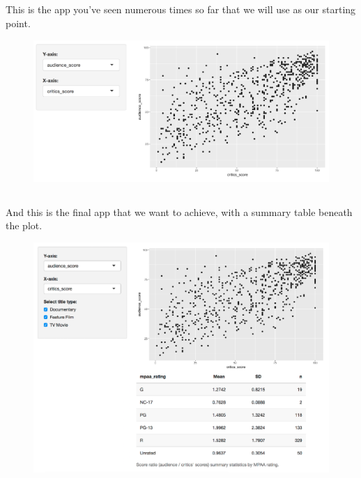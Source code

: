 \documentclass[
  letterpaper,
  DIV=11,
  numbers=noendperiod]{scrreprt}
\begin{document}
\hypertarget{section-38}{%
\subsection{}\label{section-38}}

This is the app you've seen numerous times so far that we will use as
our starting point.

\begin{figure}

{\centering \includegraphics[width=1\textwidth,height=\textheight]{./images/app-selectinput-scatterplot.png}

}

\end{figure}

\hypertarget{section-39}{%
\subsection{}\label{section-39}}

And this is the final app that we want to achieve, with a summary table
beneath the plot.

\begin{figure}

{\centering \includegraphics[width=1\textwidth,height=\textheight]{./images/app-summary-table.png}

}

\end{figure}
\end{document}

